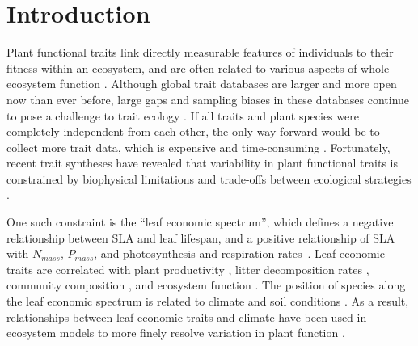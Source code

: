 \documentclass{article}
\begin{document}
\section{Introduction}

Plant functional traits link directly measurable features of individuals to their fitness within an ecosystem, and are often related to various aspects of whole-ecosystem function \citep{violle_2007_let,cardinale_2012_biodiversity}.
Although global trait databases are larger and more open now than ever before, large gaps and sampling biases in these databases continue to pose a challenge to trait ecology \citep{cornwell_2019_what}.
If all traits and plant species were completely independent from each other, the only way forward would be to collect more trait data, which is expensive and time-consuming \citep{cornwell_2019_what}.
Fortunately, recent trait syntheses have revealed that variability in plant functional traits is constrained by biophysical limitations and trade-offs between ecological strategies \citep{kattge_2011_try,wright_2004_worldwide,kleyer_2015_why,diaz_2015_global}.

One such constraint is the ``leaf economic spectrum'', which defines a negative relationship between SLA and leaf lifespan, and a positive relationship of SLA with $N_{mass}$, $P_{mass}$, and photosynthesis and respiration rates~\citep{wright_2004_worldwide,shipley_2006_fundamental,reich_2014_world,diaz_2015_global}.
Leaf economic traits are correlated with
plant productivity \citep{shipley_2005_functional,niinemets_2016_within,wu_2016_convergence},
litter decomposition rates \citep{bakker_2010_leaf,hobbie_2015_plant},
community composition \citep{burns_2004_patterns,cavender-bares_2004_multiple},
and ecosystem function \citep{diaz_2004_plant,musavi_2015_imprint}.
The position of species along the leaf economic spectrum is related to climate and soil conditions
\citep{wright_2004_worldwide,wright_2005_modulation,cornwell_2009_community,ordonez_2009_global,wigley_2016_leaf}.
As a result, relationships between leaf economic traits and climate have been used in ecosystem models to more finely resolve variation in plant function \citep{sakschewski_2015_leaf,verheijen_2015_inclusion,scheiter_2013_next}.
\end{document}
